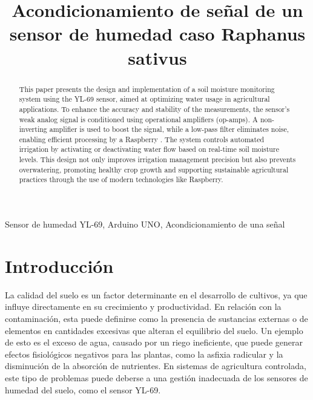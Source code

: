 \documentclass[conference]{IEEEtran}
\begin{document}
	
	\title{Acondicionamiento de señal de un sensor de humedad caso Raphanus sativus}
	\author{
		\and
		\and
	}
	
	\maketitle
	
	\begin{abstract}This paper presents the design and implementation of a soil moisture monitoring system using the YL-69 sensor, aimed at optimizing water usage in agricultural applications. To enhance the accuracy and stability of the measurements, the sensor’s weak analog signal is conditioned using operational amplifiers (op-amps). A non-inverting amplifier is used to boost the signal, while a low-pass filter eliminates noise, enabling efficient processing by a Raspberry . The system controls automated irrigation by activating or deactivating water flow based on real-time soil moisture levels. This design not only improves irrigation management precision but also prevents overwatering, promoting healthy crop growth and supporting sustainable agricultural practices through the use of modern technologies like Raspberry.
		
	\end{abstract}
	
	\begin{IEEEkeywords}
		Sensor de humedad YL-69, Arduino UNO, Acondicionamiento de una señal
	\end{IEEEkeywords}
	
	\section{Introducción}
	La calidad del suelo es un factor determinante en el desarrollo de cultivos, ya que influye directamente en su crecimiento y productividad. En relación con la contaminación, esta puede definirse como la presencia de sustancias externas o de elementos en cantidades excesivas que alteran el equilibrio del suelo. Un ejemplo de esto es el exceso de agua, causado por un riego ineficiente, que puede generar efectos fisiológicos negativos para las plantas, como la asfixia radicular y la disminución de la absorción de nutrientes. En sistemas de agricultura controlada, este tipo de problemas puede deberse a una gestión inadecuada de los sensores de humedad del suelo, como el sensor YL-69.
	
\end{document}

